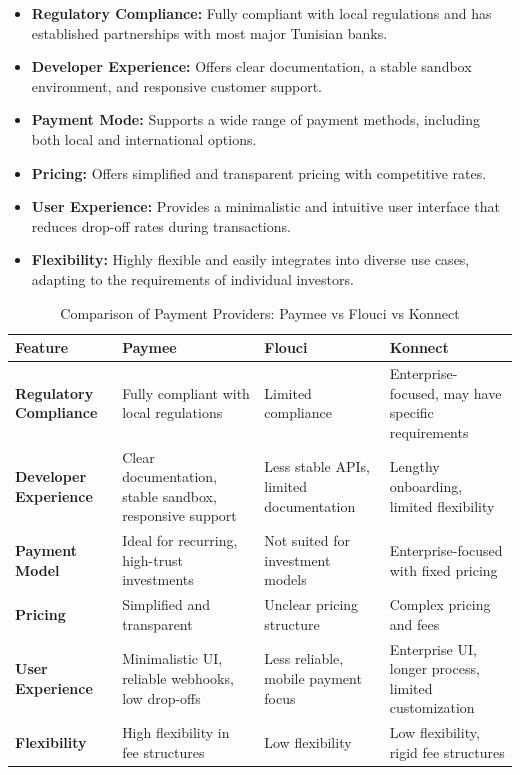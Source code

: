 \begin{itemize}
  \item \textbf{Regulatory Compliance:} Fully compliant with local regulations and has established partnerships with most major Tunisian banks.
  
  \item \textbf{Developer Experience:} Offers clear documentation, a stable sandbox environment, and responsive customer support.
  
  \item \textbf{Payment Mode:} Supports a wide range of payment methods, including both local and international options.
  
  \item \textbf{Pricing:} Offers simplified and transparent pricing with competitive rates.
  
  \item \textbf{User Experience:} Provides a minimalistic and intuitive user interface that reduces drop-off rates during transactions.
  
  \item \textbf{Flexibility:} Highly flexible and easily integrates into diverse use cases, adapting to the requirements of individual investors.
\end{itemize}
\newpage
\begin{table}[htbp]
\centering
\caption{Comparison of Payment Providers: Paymee vs Flouci vs Konnect}
\label{tab:payment_comparison}
\begin{tabular}{|p{4cm}|p{3.5cm}|p{3.5cm}|p{3.5cm}|}
\hline
\textbf{Feature} & \textbf{Paymee} & \textbf{Flouci} & \textbf{Konnect} \\ \hline
\textbf{Regulatory Compliance} & Fully compliant with local regulations & Limited compliance & Enterprise-focused, may have specific requirements \\ \hline
\textbf{Developer Experience} & Clear documentation, stable sandbox, responsive support & Less stable APIs, limited documentation & Lengthy onboarding, limited flexibility \\ \hline
\textbf{Payment Model} & Ideal for recurring, high-trust investments & Not suited for investment models & Enterprise-focused with fixed pricing \\ \hline
\textbf{Pricing} & Simplified and transparent & Unclear pricing structure & Complex pricing and fees \\ \hline
\textbf{User Experience} & Minimalistic UI, reliable webhooks, low drop-offs & Less reliable, mobile payment focus & Enterprise UI, longer process, limited customization \\ \hline
\textbf{Flexibility} & High flexibility in fee structures & Low flexibility & Low flexibility, rigid fee structures \\ \hline
\end{tabular}
\end{table}

